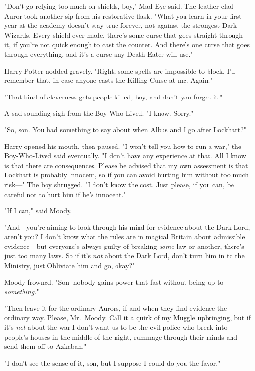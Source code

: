 "Don't go relying too much on shields, boy," Mad-Eye said. The leather-clad 
Auror took another sip from his restorative flask. "What you learn in your 
first year at the academy doesn't stay true forever, not against the strongest 
Dark Wizards. Every shield ever made, there's some curse that goes straight 
through it, if you're not quick enough to cast the counter. And there's one 
curse that goes through everything, and it's a curse any Death Eater will use."

Harry Potter nodded gravely. "Right, some spells are impossible to block. I'll 
remember that, in case anyone casts the Killing Curse at me. Again."

"That kind of cleverness gets people killed, boy, and don't you forget it."

A sad-sounding sigh from the Boy-Who-Lived. "I know. Sorry."

"So, son. You had something to say about when Albus and I go after Lockhart?"

Harry opened his mouth, then paused. "I won't tell you how to run a war," the 
Boy-Who-Lived said eventually. "I don't have any experience at that. All I know 
is that there are consequences. Please be advised that my own assessment is 
that Lockhart is probably innocent, so if you can avoid hurting him without too 
much risk---" The boy shrugged. "I don't know the cost. Just please, if you 
can, be careful not to hurt him if he's innocent."

"If I can," said Moody.

"And---you're aiming to look through his mind for evidence about the Dark Lord, 
aren't you? I don't know what the rules are in magical Britain about admissible 
evidence---but everyone's always guilty of breaking \emph{some} law or another, 
there's just too many laws. So if it's \emph{not} about the Dark Lord, don't 
turn him in to the Ministry, just Obliviate him and go, okay?"

Moody frowned. "Son, nobody gains power that fast without being up to 
\emph{something.}"

"Then leave it for the ordinary Aurors, if and when they find evidence the 
ordinary way. Please, Mr.~Moody. Call it a quirk of my Muggle upbringing, but 
if it's \emph{not} about the war I don't want us to be the evil police who 
break into people's houses in the middle of the night, rummage through their 
minds and send them off to Azkaban."

"I don't see the sense of it, son, but I suppose I could do you the favor."

